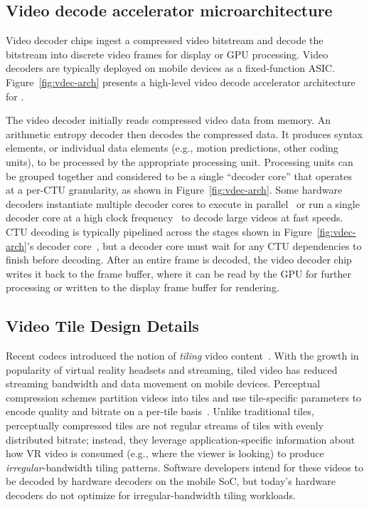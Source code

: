 \subsection{Video decode accelerator microarchitecture}
\label{subsec:vd-arch}
Video decoder chips ingest a compressed video bitstream and decode the bitstream into discrete video frames for display or GPU processing.
Video decoders are typically deployed on mobile devices as a fixed-function ASIC.
Figure~\ref{fig:vdec-arch} presents a high-level video decode accelerator architecture for \hevc.

The video decoder initially reads compressed video data from memory.
An arithmetic entropy decoder then decodes the compressed data.
It produces syntax elements, or individual data elements (e.g., motion predictions, other coding units), to be processed by the appropriate processing unit.
Processing units can be grouped together and considered to be a single ``decoder core'' that operates at a per-CTU granularity, as shown in Figure~\ref{fig:vdec-arch}.
Some hardware decoders instantiate multiple decoder cores to execute in parallel~\cite{tikekar18ijssc} or run a single decoder core at a high clock frequency~\cite{8khevc-ijssc} to decode large videos at fast speeds.
CTU decoding is typically pipelined across the stages shown in Figure~\ref{fig:vdec-arch}'s decoder core~\cite{8khevc-ijssc}, but a decoder core must wait for any CTU dependencies to finish before decoding.
After an entire frame is decoded, the video decoder chip writes it back to the frame buffer, where it can be read by the GPU for further processing or written to the display frame buffer for rendering.

\subsection{Video Tile Design Details}
\label{subsec:mv-tiles}

Recent codecs introduced the notion of \emph{tiling} video content~\cite{misra2013tiles}.
With the growth in popularity of virtual reality headsets and \threesixty streaming, tiled video has reduced streaming bandwidth and data movement on mobile devices.
Perceptual compression schemes partition videos into tiles and use tile-specific parameters to encode quality and bitrate on a per-tile basis~\cite{visualcloud2017haynes}.
Unlike traditional \hevc tiles, perceptually compressed tiles are not regular streams of tiles with evenly distributed bitrate; instead, they leverage application-specific information about how VR video is consumed (e.g., where the viewer is looking) to produce \emph{irregular}-bandwidth tiling patterns.
Software developers intend for these videos to be decoded by hardware decoders on the mobile SoC, but today's hardware decoders do not optimize for irregular-bandwidth tiling workloads.

